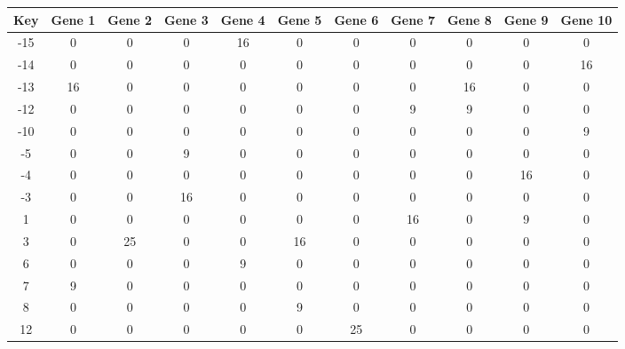 \begin{tabular}{|c|c|c|c|c|c|c|c|c|c|c|}
\hline
Key & Gene 1 & Gene 2 & Gene 3 & Gene 4 & Gene 5 & Gene 6 & Gene 7 & Gene 8 & Gene 9 & Gene 10 \\
\hline
-15 & 0 & 0 & 0 & 16 & 0 & 0 & 0 & 0 & 0 & 0 \\
-14 & 0 & 0 & 0 & 0 & 0 & 0 & 0 & 0 & 0 & 16 \\
-13 & 16 & 0 & 0 & 0 & 0 & 0 & 0 & 16 & 0 & 0 \\
-12 & 0 & 0 & 0 & 0 & 0 & 0 & 9 & 9 & 0 & 0 \\
-10 & 0 & 0 & 0 & 0 & 0 & 0 & 0 & 0 & 0 & 9 \\
-5 & 0 & 0 & 9 & 0 & 0 & 0 & 0 & 0 & 0 & 0 \\
-4 & 0 & 0 & 0 & 0 & 0 & 0 & 0 & 0 & 16 & 0 \\
-3 & 0 & 0 & 16 & 0 & 0 & 0 & 0 & 0 & 0 & 0 \\
1 & 0 & 0 & 0 & 0 & 0 & 0 & 16 & 0 & 9 & 0 \\
3 & 0 & 25 & 0 & 0 & 16 & 0 & 0 & 0 & 0 & 0 \\
6 & 0 & 0 & 0 & 9 & 0 & 0 & 0 & 0 & 0 & 0 \\
7 & 9 & 0 & 0 & 0 & 0 & 0 & 0 & 0 & 0 & 0 \\
8 & 0 & 0 & 0 & 0 & 9 & 0 & 0 & 0 & 0 & 0 \\
12 & 0 & 0 & 0 & 0 & 0 & 25 & 0 & 0 & 0 & 0 \\
\hline
\end{tabular}
